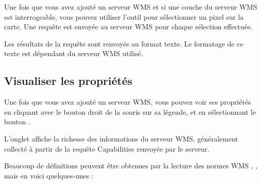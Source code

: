 Une fois que vous avez ajouté un serveur WMS et si une couche du serveur WMS est interrogeable, vous pouvez utiliser l'outil   pour sélectionner un pixel sur la carte. Une requête est envoyée au serveur WMS pour chaque sélection effectuée.

Les résultats de la requête sont renvoyés au format texte. Le formatage de ce texte est dépendant du serveur WMS utilisé.

\subsection{Visualiser les propriétés}
\label{sec:ogc-wms-properties}

Une fois que vous avez ajouté un serveur WMS, vous pouvez voir ses propriétés en cliquant avec le bouton droit de la souris sur sa légende, et en sélectionnant le bouton  .

\label{sec:ogc-wms-properties-metadata}

L'onglet  affiche la richesse des informations du serveur WMS, généralement collecté à partir de la requête Capabilities renvoyée par le serveur.

Beaucoup de définitions peuvent être obtenues par la lecture des normes WMS \cite{OGCWMS010101web}, \cite{OGCWMS010300web}, mais en voici quelques-unes :

